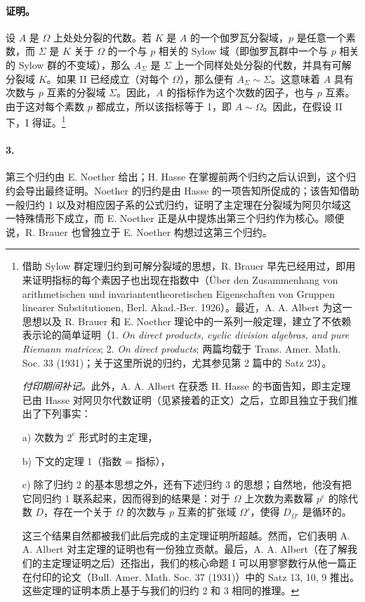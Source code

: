 \paragraph{证明。}
设 \(A\) 是 \(\Omega\) 上处处分裂的代数。若 \(K\) 是 \(A\) 的一个伽罗瓦分裂域，\(p\) 是任意一个素数，而 \(\Sigma\) 是 \(K\) 关于 \(\Omega\) 的一个与 \(p\) 相关的 Sylow 域（即伽罗瓦群中一个与 \(p\) 相关的 Sylow 群的不变域），那么 \(A_{\Sigma}\) 是 \(\Sigma\) 上一个同样处处分裂的代数，并具有可解分裂域 \(K\)。如果 II 已经成立（对每个 \(\Omega\)），那么便有 \(A_{\Sigma}\sim \Sigma\)。这意味着 \(A\) 具有次数与 \(p\) 互素的分裂域 \(\Sigma\)。因此，\(A\) 的指标作为这个次数的因子，也与 \(p\) 互素。由于这对每个素数 \(p\) 都成立，所以该指标等于 1，即 \(A\sim\Omega\)。因此，在假设 II 下，I 得证。\footnote{借助 Sylow 群定理归约到可解分裂域的思想，R. Brauer 早先已经用过，即用来证明指标的每个素因子也出现在指数中（Über den Zusammenhang von arithmetischen und invariantentheoretischen Eigenschaften von Gruppen linearer Substitutionen, Berl. Akad.-Ber. 1926）。最近，A. A. Albert 为这一思想以及 R. Brauer 和 E. Noether 理论中的一系列一般定理，建立了不依赖表示论的简单证明（1. \emph{On direct products, cyclic division algebras, and pure Riemann matrices}; 2. \emph{On direct products}; 两篇均载于 Trans. Amer. Math. Soc. 33 (1931)；关于这里所说的归约，尤其参见第 2 篇中的 Satz 23）。

\emph{付印期间补记。}此外，A. A. Albert 在获悉 H. Hasse 的书面告知，即主定理已由 Hasse 对阿贝尔代数证明（见紧接着的正文）之后，立即且独立于我们推出了下列事实：

a) 次数为 \(2^e\) 形式时的主定理，

b) 下文的定理 1（指数 = 指标），

c) 除了归约 2 的基本思想之外，还有下述归约 3 的思想；自然地，他没有把它同归约 1 联系起来，因而得到的结果是：对于 \(\Omega\) 上次数为素数幂 \(p^e\) 的除代数 \(D\)，存在一个关于 \(\Omega\) 的次数与 \(p\) 互素的扩张域 \(\Omega'\)，使得 \(D_{\Omega'}\) 是循环的。

这三个结果自然都被我们此后完成的主定理证明所超越。然而，它们表明 A. A. Albert 对主定理的证明也有一份独立贡献。最后，A. A. Albert（在了解我们的主定理证明之后）还指出，我们的核心命题 I 可以用寥寥数行从他一篇正在付印的论文（Bull. Amer. Math. Soc. 37 (1931)）中的 Satz 13, 10, 9 推出。这些定理的证明本质上基于与我们的归约 2 和 3 相同的推理。}

\paragraph{3.}
第三个归约由 E. Noether 给出；H. Hasse 在掌握前两个归约之后认识到，这个归约会导出最终证明。Noether 的归约是由 Hasse 的一项告知所促成的；该告知借助一般归约 1 以及对相应因子系的公式归约，证明了主定理在分裂域为阿贝尔域这一特殊情形下成立，而 E. Noether 正是从中提炼出第三个归约作为核心。顺便说，R. Brauer 也曾独立于 E. Noether 构想过这第三个归约。


